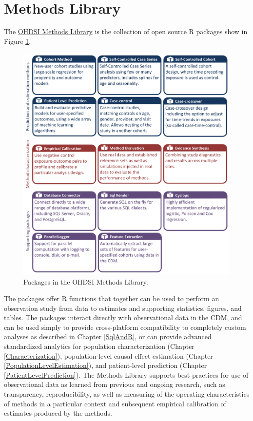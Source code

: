 \documentclass[11pt]{book}
\begin{document}
\section{Methods Library}\label{methods-library}

The \href{https://ohdsi.github.io/MethodsLibrary/}{OHDSI Methods
Library} is the collection of open source R packages show in Figure
\ref{fig:methodsLibrary}.

\begin{figure}

{\centering \includegraphics[width=1\linewidth]{images/OhdsiAnalyticsTools/methodsLibrary} 

}

\caption{Packages in the OHDSI Methods Library.}\label{fig:methodsLibrary}
\end{figure}

The packages offer R functions that together can be used to perform an
observation study from data to estimates and supporting statistics,
figures, and tables. The packages interact directly with observational
data in the CDM, and can be used simply to provide cross-platform
compatibility to completely custom analyses as described in Chapter
\ref{SqlAndR}, or can provide advanced standardized analytics for
population characterization (Chapter \ref{Characterization}),
population-level causal effect estimation (Chapter
\ref{PopulationLevelEstimation}), and patient-level prediction (Chapter
\ref{PatientLevelPrediction}). The Methods Library supports best
practices for use of observational data as learned from previous and
ongoing research, such as transparency, reproducibility, as well as
measuring of the operating characteristics of methods in a particular
context and subsequent empirical calibration of estimates produced by
the methods.
\end{document}
